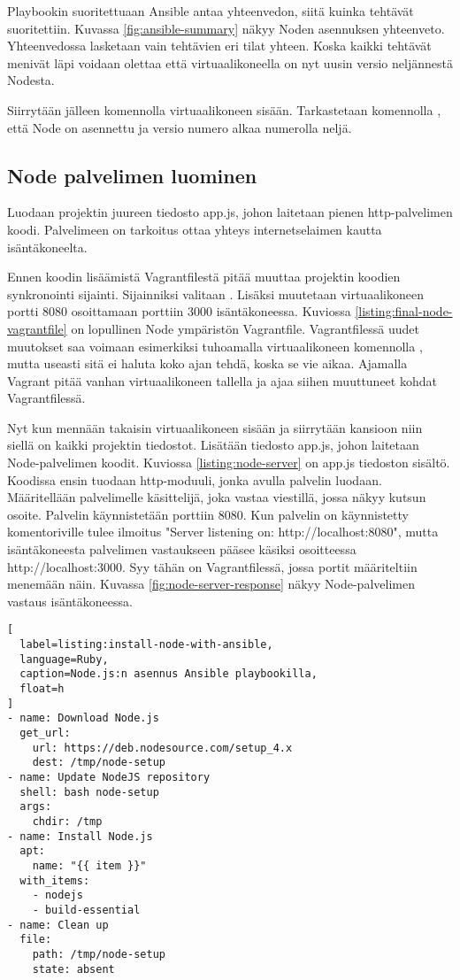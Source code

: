 Playbookin suoritettuaan Ansible antaa yhteenvedon, siitä kuinka tehtävät suoritettiin. Kuvassa \ref{fig:ansible-summary} näkyy Noden asennuksen yhteenveto. Yhteenvedossa lasketaan vain tehtävien eri tilat yhteen. Koska kaikki tehtävät menivät läpi voidaan olettaa että virtuaalikoneella on nyt uusin versio neljännestä Nodesta.

Siirrytään jälleen komennolla  virtuaalikoneen sisään. Tarkastetaan komennolla , että Node on asennettu ja versio numero alkaa numerolla neljä.

\subsection{Node palvelimen luominen}

Luodaan projektin juureen tiedosto app.js, johon laitetaan pienen http-palvelimen koodi. Palvelimeen on tarkoitus ottaa yhteys internetselaimen kautta isäntäkoneelta.

Ennen koodin lisäämistä Vagrantfilestä pitää muuttaa projektin koodien synkronointi sijainti. Sijainniksi valitaan . Lisäksi muutetaan virtuaalikoneen portti 8080 osoittamaan porttiin 3000 isäntäkoneessa. Kuviossa \ref{listing:final-node-vagrantfile} on lopullinen Node ympäristön Vagrantfile. Vagrantfilessä uudet muutokset saa voimaan esimerkiksi tuhoamalla virtuaalikoneen komennolla , mutta useasti sitä ei haluta koko ajan tehdä, koska se vie aikaa. Ajamalla  Vagrant pitää vanhan virtuaalikoneen tallella ja ajaa siihen muuttuneet kohdat Vagrantfilessä.

Nyt kun mennään takaisin virtuaalikoneen sisään ja siirrytään kansioon  niin siellä on kaikki projektin tiedostot. Lisätään tiedosto app.js, johon laitetaan Node-palvelimen koodit. Kuviossa \ref{listing:node-server} on app.js tiedoston sisältö. Koodissa ensin tuodaan http-moduuli, jonka avulla palvelin luodaan. Määritellään palvelimelle käsittelijä, joka vastaa viestillä, jossa näkyy kutsun osoite. Palvelin käynnistetään porttiin 8080. Kun palvelin on käynnistetty komentoriville tulee ilmoitus "Server listening on: http://localhost:8080", mutta isäntäkoneesta palvelimen vastaukseen pääsee käsiksi osoitteessa http://localhost:3000. Syy tähän on Vagrantfilessä, jossa portit määriteltiin menemään näin. Kuvassa \ref{fig:node-server-response} näkyy Node-palvelimen vastaus isäntäkoneessa.

\begin{lstlisting}[
  label=listing:install-node-with-ansible,
  language=Ruby,
  caption=Node.js:n asennus Ansible playbookilla,
  float=h
]
- name: Download Node.js
  get_url:
    url: https://deb.nodesource.com/setup_4.x
    dest: /tmp/node-setup
- name: Update NodeJS repository
  shell: bash node-setup
  args:
    chdir: /tmp
- name: Install Node.js
  apt:
    name: "{{ item }}"
  with_items:
    - nodejs
    - build-essential
- name: Clean up
  file:
    path: /tmp/node-setup
    state: absent
\end{lstlisting}

